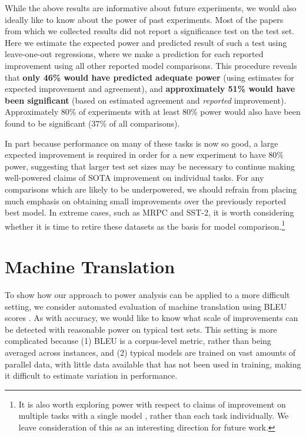 \documentclass[11pt,a4paper]{article}
\begin{document}
While the above results are informative about future experiments, 
we would
also
ideally 
like to know about the power of past experiments.
Most of the papers from which we collected results did not report a significance test on the test set. Here we estimate the expected power and predicted result of such a test using leave-one-out regressions, where we make a prediction for each reported improvement using all other reported model comparisons. This procedure reveals that \textbf{only 46\% would have predicted adequate power} (using estimates for expected improvement and agreement), and \textbf{approximately 51\% would have been significant} (based on estimated agreement and \emph{reported} improvement). Approximately 80\% of experiments with at least 80\% power would also have been found to be significant (37\% of all comparisons).


In part because performance on many of these tasks is now so good, a large expected improvement is required in order for 
a new experiment 
to have 80\% power, suggesting that larger test set sizes may be necessary to continue making well-powered claims of SOTA improvement on individual tasks.
For any comparisons which are likely to be underpowered, we should refrain from placing much emphasis on obtaining small improvements over the previously reported best model. In extreme cases, such as MRPC and SST-2, it is worth considering whether it is time to retire these datasets as the basis for model comparison.\footnote{
It is also worth exploring power with respect to claims of improvement on multiple tasks with a single model \citep{demsar.2006}, rather than each task individually. We leave consideration of  this as an interesting direction for future work.}


\section{Machine Translation} \label{sec:mt}

To show how our approach to power analysis can be applied to
a more difficult setting, we consider
automated
evaluation of machine translation using BLEU
scores
\citep{papineni.2002}.
As
with 
accuracy, we would like to know 
what scale of improvements can be detected with reasonable power on typical test sets.
This setting is more complicated 
because
(1) BLEU is a corpus-level metric, rather than being averaged across instances, 
and 
(2) typical models are trained on vast amounts of parallel data, with little
data
available that has not been used in training, making it difficult to
estimate variation in performance. 
\end{document}
